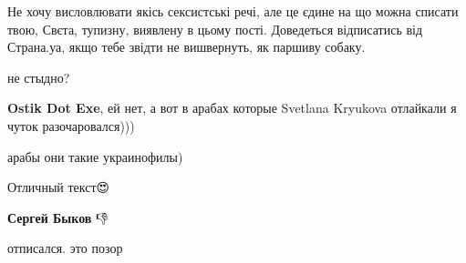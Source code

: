 \begin{itemize}
Не хочу висловлювати якісь сексистські речі, але це єдине на що можна списати
твою, Свєта, тупизну, виявлену в цьому пості. Доведеться відписатись від
Страна.уа, якщо тебе звідти не вишвернуть, як паршиву собаку.

%
%
 
не стыдно?

\begin{itemize}
 
\textbf{Ostik Dot Exe}, ей нет, а вот в арабах которые Svetlana Kryukova отлайкали я чуток разочаровался)))

 
арабы они такие украинофилы)
\end{itemize}

 
Отличный текст😍

\begin{itemize}
 
\textbf{Сергей Быков} 👎
\end{itemize}

 
отписался. это позор

 

\end{itemize}
